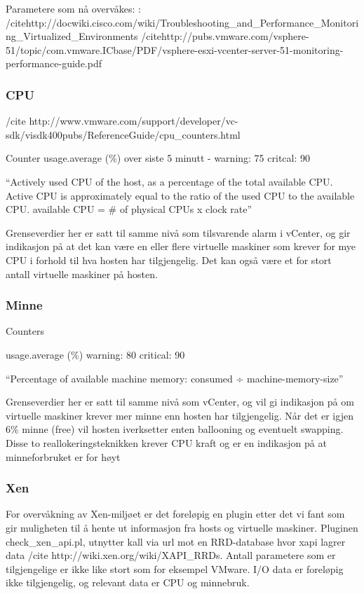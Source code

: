  Parametere som nå overvåkes: : 
/citehttp://docwiki.cisco.com/wiki/Troubleshooting\_and\_Performance\_Monitoring\_Virtualized\_Environments
/citehttp://pubs.vmware.com/vsphere-51/topic/com.vmware.ICbase/PDF/vsphere-esxi-vcenter-server-51-monitoring-performance-guide.pdf

\subsubsection{CPU}

/cite http://www.vmware.com/support/developer/vc-sdk/visdk400pubs/ReferenceGuide/cpu\_counters.html


Counter usage.average (\%) over siste 5 minutt -  warning: 75 critcal: 90 

``Actively used CPU of the host, as a percentage of the total available CPU. Active CPU is approximately equal to the ratio of the used CPU to the available CPU. available CPU = \# of physical CPUs x clock rate''

Grenseverdier her er satt til samme nivå som tilsvarende alarm i vCenter, og gir indikasjon på at det kan være en eller flere virtuelle maskiner som krever for mye CPU i forhold til hva hosten har tilgjengelig. Det kan også være et for stort antall virtuelle maskiner på hosten. 

\subsubsection{Minne}

Counters 

 usage.average (\%) warning: 80 critical: 90

“Percentage of available machine memory: consumed ÷ machine-memory-size”

Grenseverdier her er satt til samme nivå som vCenter, og vil gi indikasjon på om virtuelle maskiner krever mer minne enn hosten har tilgjengelig. Når det er igjen 6\% minne (free) vil hosten iverksetter enten ballooning og eventuelt swapping. Disse to reallokeringsteknikken krever CPU kraft og er en indikasjon på at minneforbruket er for høyt

\subsubsection{Xen}

For overvåkning av Xen-miljøet er det foreløpig en plugin etter det vi fant som gir muligheten til å hente ut informasjon fra hosts og virtuelle maskiner. Pluginen check\_xen\_api.pl, utnytter kall via url mot en RRD-database hvor xapi lagrer data /cite http://wiki.xen.org/wiki/XAPI\_RRDs. 
Antall parametere som er tilgjengelige er ikke like stort som for eksempel VMware. I/O data er foreløpig ikke tilgjengelig, og relevant data er CPU og minnebruk.


